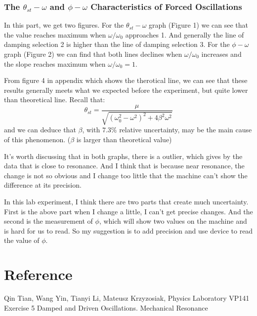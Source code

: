 \documentclass[12pt,a4paper]{article}
\begin{document}
\subsubsection{The $\theta_{st}-\omega$ and $\phi-\omega$ Characteristics of Forced Oscillations}
\qquad In this part, we get two figures. For the $\theta_{st}-\omega$ graph (Figure 1) we can see that the value reaches maximum when $\omega/\omega_0$ approaches 1.
And generally the line of damping selection 2 is higher than the line of damping selection 3.
For the $\phi-\omega$ graph (Figure 2) we can find that both lines declines when $\omega/\omega_0$
increases and the slope reaches maximum when $\omega/\omega_0=1$.
\par From figure 4 in appendix which shows the therotical line, we can see that these results generally meets what we expected before the experiment, but quite lower than theoretical line. Recall that:
\begin{equation}
    \theta_{st}=\frac{\mu}{\sqrt{(\omega_0^2-\omega^2)^2+4\beta^2\omega^2}}
    \nonumber
\end{equation}
and we can deduce that $\beta$, with $7.3\%$ relative uncertainty, may be the main cause of this phenomenon. ($\beta$ is larger than theoretical value)
\par It's worth discussing that in both graphs, there is a outlier, which gives by the data that is close to 
resonance. And I think that is because near resonance, the change is not so obvious and I change
too little that the machine can't show the difference at its precision.
\par In this lab experiment, I think there are two parts that create much uncertainty. First is the above part when I change
a little, I can't get precise changes. And the second is the measurement of $\phi$, which will show two values on the machine
and is hard for us to read. So my suggestion is to add precision and use device to read the value of $\phi$.

\section{Reference}

Qin Tian, Wang Yin, Tianyi Li, Mateusz Krzyzosiak, Physics Laboratory VP141 Exercise 5 Damped and Driven Oscillations.
Mechanical Resonance
\end{document}
